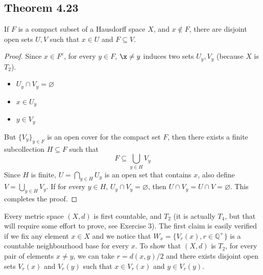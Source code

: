 \documentclass[../../main.tex]{subfiles}
\begin{document}
\subsection{Theorem 4.23}
\begin{wts}
If $F$ is a compact subset of a Hausdorff space $X$, and $x\notin F$, there are disjoint open sets $U, V$ such that $x\in U$ and $F\subseteq V$.
\end{wts}
\begin{proof}
Since $x\in F^c$, for every $y\in F$, $\x\neq y$ induces two sets $U_y, V_y$ (because $X$ is $T_2$).
\begin{itemize}
    \item $U_y\cap V_y=\varnothing$
    \item $x\in U_y$
    \item $y\in V_y$
\end{itemize}
But $\{V_y\}_{y\in F}$ is an open cover for the compact set $F$, then there exists a finite subcollection $H\subseteq F$ such that 
\[
F\subseteq \bigcup_{y\in H}V_y
\]
Since $H$ is finite, $U=\bigcap_{y\in H}U_y$ is an open set that contains $x$, also define $V = \bigcup_{y\in H}V_y$. If for every $y\in H$, $U_y\cap V_y=\varnothing$, then $U\cap V_y=U\cap V=\varnothing$. This completes the proof.
\end{proof}
\remark Every metric space $(X,d)$ is first countable, and $T_2$ (it is actually $T_4$, but that will require some effort to prove, see Exercise 3). The first claim is easily verified if we fix any element $x\in X$ and we notice that $W_x=\{V_{r}(x), r\in \mathbb{Q}^+\}$ is a countable neighbourhood base for every $x$. To show that $(X,d)$ is $T_2$, for every pair of elements $x\neq y$, we can take $r=d(x,y)/2$ and there exists disjoint open sets $V_r(x)$ and $V_r(y)$ such that $x\in V_r(x)$ and $y\in V_r(y)$.
\end{document}

